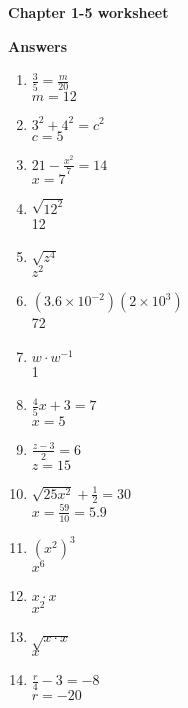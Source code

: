 \documentclass[12pt]{article}
\begin{document}
\Large

\textbf{ Chapter 1-5 worksheet }

\textbf{ Answers }

\begin{multicols}{2}
\begin{enumerate}

	\item \( \frac{3}{5} = \frac{m}{20} \) \\
		\( m = 12 \)

	\item \( 3^{2} + 4^{2} = c^{2} \) \\
		\( c = 5 \)

	\item \( 21 - \frac{x^{2}}{7} = 14 \) \\
		\( x = 7 \)

	\item \( \sqrt{12^{2}} \) \\
		12

	\item \( \sqrt{z^{4}} \) \\
		\( z^{2} \)

	\item \( (3.6 \times 10^{-2})(2 \times 10^{3}) \) \\
		72

	\item \( w \cdot w^{-1} \) \\
		1

	\item \( \frac{4}{5}x + 3 = 7 \) \\
		\( x = 5 \)

	\item \( \frac{z - 3}{2} = 6 \) \\
		\( z = 15 \)

	\item \( \sqrt{25x^{2}} + \frac{1}{2} = 30 \) \\
		\( x = \frac{59}{10} = 5.9 \)

	\item \( (x^{2})^{3} \) \\
		\( x^{6} \)

	\item \( x \cdot x \) \\
		\( x^{2} \)

	\item \( \sqrt{ x \cdot x } \) \\
		\( x \)

	\item \( \frac{r}{4} - 3 = -8 \) \\
		\( r = -20 \)


\end{enumerate}
\end{multicols}
\end{document}
